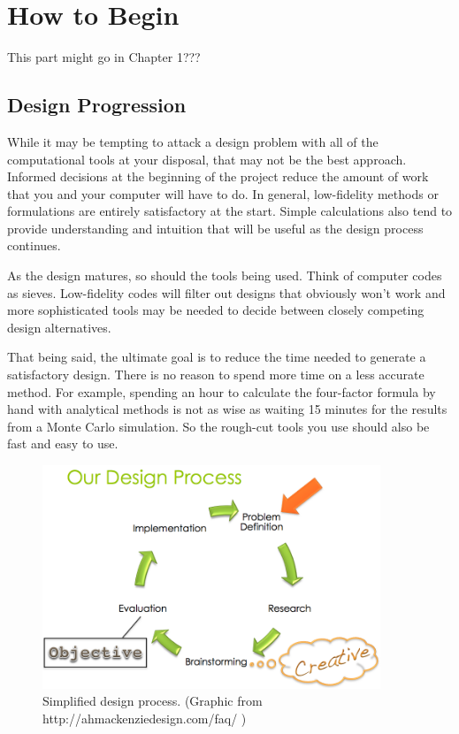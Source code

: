 \chapter{How to Begin}
This part might go in Chapter 1???

\section{Design Progression}
While it may be tempting to attack a design problem with all of the computational tools at your disposal, that may not be the best approach. Informed decisions at the beginning of the project reduce the amount of work that you and your computer will have to do. 
In general, low-fidelity methods or formulations are entirely satisfactory at the start. Simple calculations also tend to provide understanding and intuition that will be useful as the design process continues.

As the design matures, so should the tools being used. Think of computer codes as sieves. Low-fidelity codes will filter out designs that obviously won't work and more sophisticated tools may be needed to decide between closely competing design alternatives.

That being said, the ultimate goal is to reduce the time needed to generate a satisfactory design. There is no reason to spend more time on a less accurate method. For example, spending an hour to calculate the four-factor formula by hand with analytical methods is not as wise as waiting 15 minutes for the results from a Monte Carlo simulation. So the rough-cut tools you use should also be fast and easy to use.

\begin{figure}
  \label{fig:linear_design}
  \centering
  \includegraphics[width=0.90\textwidth]{graphics/design_process_big.png}
  \caption{Simplified design process. (Graphic from http://ahmackenziedesign.com/faq/ )}
\end{figure}

